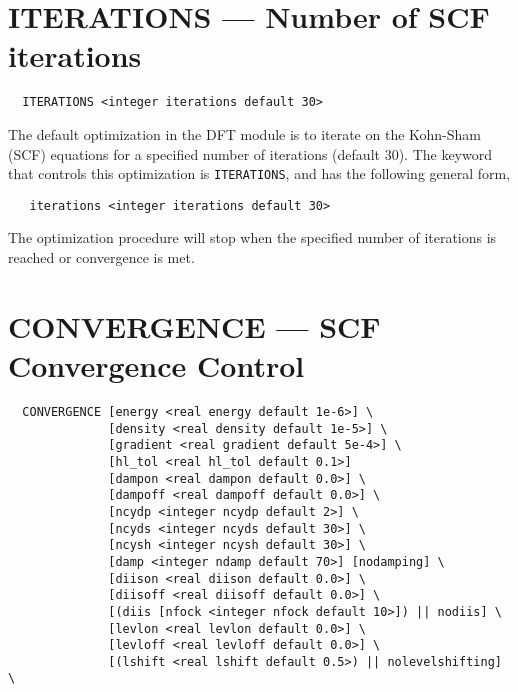 \onecolumn

\section{ITERATIONS --- Number of SCF iterations}

\begin{verbatim}
  ITERATIONS <integer iterations default 30>
\end{verbatim}

The default optimization in the DFT module is to iterate on the 
Kohn-Sham (SCF) equations for a specified number of iterations
(default 30).  The keyword that controls this optimization 
is \verb+ITERATIONS+, and has the following general form,

\begin{verbatim}
   iterations <integer iterations default 30>
\end{verbatim}

The optimization procedure will stop when the specified number of
iterations is reached or convergence is met.

\section{CONVERGENCE --- SCF Convergence Control}

\begin{verbatim}
  CONVERGENCE [energy <real energy default 1e-6>] \
              [density <real density default 1e-5>] \
              [gradient <real gradient default 5e-4>] \
              [hl_tol <real hl_tol default 0.1>]
              [dampon <real dampon default 0.0>] \
              [dampoff <real dampoff default 0.0>] \
              [ncydp <integer ncydp default 2>] \
              [ncyds <integer ncyds default 30>] \
              [ncysh <integer ncysh default 30>] \
              [damp <integer ndamp default 70>] [nodamping] \
              [diison <real diison default 0.0>] \
              [diisoff <real diisoff default 0.0>] \
              [(diis [nfock <integer nfock default 10>]) || nodiis] \
              [levlon <real levlon default 0.0>] \
              [levloff <real levloff default 0.0>] \
              [(lshift <real lshift default 0.5>) || nolevelshifting] \
\end{verbatim}

